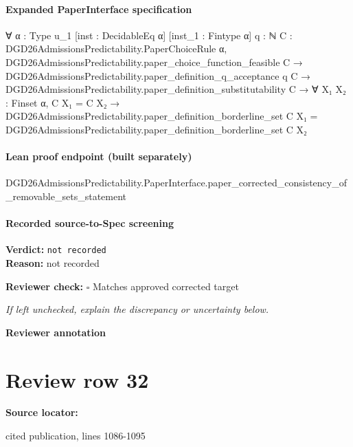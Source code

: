 \documentclass[10pt]{article}
\newcommand{\reviewerbox}{%
  \par\noindent\fbox{\parbox{0.96\linewidth}{\rule{0pt}{0.38in}}}\par
}
\newcommand{\reviewmatch}[1]{%
  \par\noindent\textbf{Reviewer check:} $\square$\; #1\par
  \noindent\emph{If left unchecked, explain the discrepancy or uncertainty below.}\par
}
\begin{document}
\paragraph{Expanded PaperInterface specification}
\begin{ReviewVerbatim}
∀ {α : Type u_1} [inst : DecidableEq α] [inst_1 : Fintype α] {q : ℕ}
  {C : DGD26AdmissionsPredictability.PaperChoiceRule α},
  DGD26AdmissionsPredictability.paper_choice_function_feasible C →
    DGD26AdmissionsPredictability.paper_definition_q_acceptance q C →
      DGD26AdmissionsPredictability.paper_definition_substitutability C →
        ∀ {X₁ X₂ : Finset α},
          C X₁ = C X₂ →
            DGD26AdmissionsPredictability.paper_definition_borderline_set C X₁ =
              DGD26AdmissionsPredictability.paper_definition_borderline_set C X₂
\end{ReviewVerbatim}

\paragraph{Lean proof endpoint (built separately)}\begin{ReviewVerbatim}
DGD26AdmissionsPredictability.PaperInterface.paper_corrected_consistency_of_removable_sets_statement
\end{ReviewVerbatim}

\paragraph{Recorded source-to-Spec screening}
\textbf{Verdict:} \texttt{not recorded}
\\
\textbf{Reason:} not recorded
\reviewmatch{Matches approved corrected target}
\noindent\textbf{Reviewer annotation}\par
\reviewerbox
\clearpage
\hypertarget{source-claim-7d8732899c3f4210}{}
\section*{Review row 32}
\textbf{Source locator:} {\footnotesize\raggedright cited publication, lines 1086-\allowbreak{}1095\par}
\end{document}
